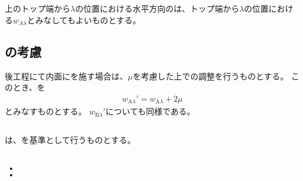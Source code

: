\subsection{\HorizontalID}
\CenterCurvatureLine 上のトップ端から$\lambda$の位置における水平方向の\HorizontalID は、トップ端から$\lambda$の位置における\ACID$w_{A\lambda}$とみなしてもよいものとする。

\subsection{\PlatingThk の考慮}
後工程にて内面に\Plating を施す場合は、\PlatingThk$\mu$を考慮した上で\InnerDiameter の調整を行うものとする。
このとき、\ACID を
\begin{align*}
  w_{\mathrm A\lambda}' = w_{\mathrm A\lambda}+2\mu
\end{align*}
とみなすものとする。
\BDID$w_{\mathrm B\lambda}'$についても同様である。



\clearpage


\subsection{\EndFacecutMillingReferencePoint}
\EndFacecutMillingReferencePoint は、\EndFaceIDCenter を基準として行うものとする。


\subsection{\indexTCEndFacecutMilling\nameToolCorrection：\nameEndFacecutMilling}

